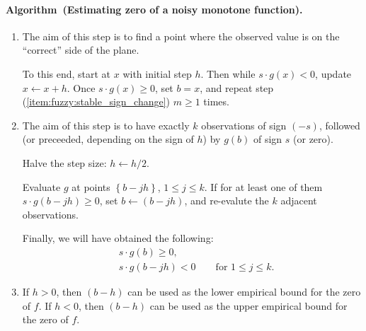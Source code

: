 \documentclass[12pt]{article}
\renewcommand{\geq}{\geqslant}
\renewcommand{\leq}{\leqslant}
\newcommand{\set}[1]{\left\{ #1 \right\}}
\newenvironment{algorithm}[1][]{\paragraph*{Algorithm#1.}}{\vspace{1ex}}
\begin{document}
\begin{algorithm}[~(Estimating zero of a noisy monotone function)]
\begin{enumerate}
        \item \label{item:fuzzy:first_cross}
            The aim of this step is to find a point where the observed value is on the ``correct'' side of the plane.

            To this end, start at $x$ with initial step $h$.
            Then while $s \cdot g(x) < 0$, update $x \leftarrow x + h$. Once $s \cdot g(x) \geq 0$, set $b = x$, and repeat step (\ref{item:fuzzy:stable_sign_change}) $m \geq 1$ times.

        \item \label{item:fuzzy:stable_sign_change}
            The aim of this step is to have exactly $k$ observations of sign $(-s)$, followed (or preceeded, depending on the sign of $h$) by $g(b)$ of sign $s$ (or zero).

            Halve the step size: $h \leftarrow h / 2$.

            Evaluate $g$ at points $\set{b - j h}$, $1 \leq j \leq k$. If for at least one of them $s \cdot g(b - j h) \geq 0$, set $b \leftarrow (b - j h)$, and re-evalute the $k$ adjacent observations.

            Finally, we will have obtained the following:
            \begin{align*}
                &s \cdot g(b) \geq 0, \\
                &s \cdot g(b - j h) < 0 \qquad \text{for $1 \leq j \leq k$}.
            \end{align*}

        \item If $h > 0$, then $(b - h)$ can be used as the lower empirical bound for the zero of $f$. If $h < 0$, then $(b - h)$ can be used as the upper empirical bound for the zero of $f$.
    \end{enumerate}
\end{algorithm}
\end{document}
